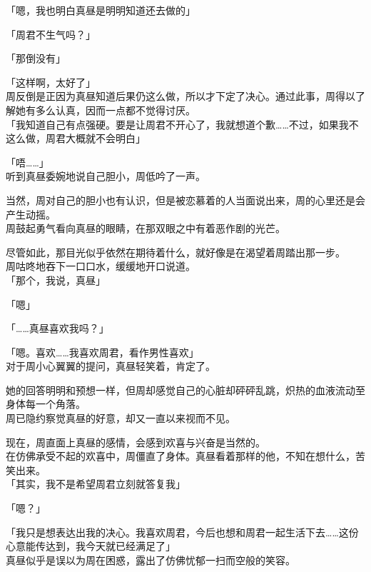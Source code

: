 「嗯，我也明白真昼是明明知道还去做的」

「周君不生气吗？」

「那倒没有」

「这样啊，太好了」\\

周反倒是正因为真昼知道后果仍这么做，所以才下定了决心。通过此事，周得以了解她有多么认真，因而一点都不觉得讨厌。\\

「我知道自己有点强硬。要是让周君不开心了，我就想道个歉……不过，如果我不这么做，周君大概就不会明白」

「唔……」\\

听到真昼委婉地说自己胆小，周低吟了一声。

当然，周对自己的胆小也有认识，但是被恋慕着的人当面说出来，周的心里还是会产生动摇。\\

周鼓起勇气看向真昼的眼睛，在那双眼之中有着恶作剧的光芒。

尽管如此，那目光似乎依然在期待着什么，就好像是在渴望着周踏出那一步。\\

周咕咚地吞下一口口水，缓缓地开口说道。\\

「那个，我说，真昼」

「嗯」

「……真昼喜欢我吗？」

「嗯。喜欢……我喜欢周君，看作男性喜欢」\\

对于周小心翼翼的提问，真昼轻笑着，肯定了。

她的回答明明和预想一样，但周却感觉自己的心脏却砰砰乱跳，炽热的血液流动至身体每一个角落。\\

周已隐约察觉真昼的好意，却又一直以来视而不见。

现在，周直面上真昼的感情，会感到欢喜与兴奋是当然的。\\

在仿佛承受不起的欢喜中，周僵直了身体。真昼看着那样的他，不知在想什么，苦笑出来。\\

「其实，我不是希望周君立刻就答复我」

「嗯？」

「我只是想表达出我的决心。我喜欢周君，今后也想和周君一起生活下去……这份心意能传达到，我今天就已经满足了」\\

真昼似乎是误以为周在困惑，露出了仿佛忧郁一扫而空般的笑容。\\


